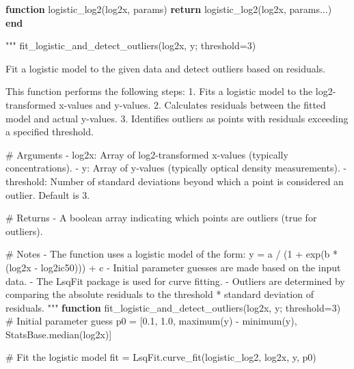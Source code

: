 \documentclass[
]{scrartcl}
\newenvironment{Shaded}{\begin{snugshade}}{\end{snugshade}}
\newcommand{\CommentTok}[1]{\textcolor[rgb]{0.37,0.37,0.37}{#1}}
\newcommand{\ControlFlowTok}[1]{\textcolor[rgb]{0.00,0.23,0.31}{\textbf{#1}}}
\newcommand{\FloatTok}[1]{\textcolor[rgb]{0.68,0.00,0.00}{#1}}
\newcommand{\FunctionTok}[1]{\textcolor[rgb]{0.28,0.35,0.67}{#1}}
\newcommand{\KeywordTok}[1]{\textcolor[rgb]{0.00,0.23,0.31}{\textbf{#1}}}
\newcommand{\NormalTok}[1]{\textcolor[rgb]{0.00,0.23,0.31}{#1}}
\newcommand{\OperatorTok}[1]{\textcolor[rgb]{0.37,0.37,0.37}{#1}}
\newcommand{\StringTok}[1]{\textcolor[rgb]{0.13,0.47,0.30}{#1}}
\begin{document}
\begin{Shaded}
\begin{Highlighting}[]
\KeywordTok{function} \FunctionTok{logistic\_log2}\NormalTok{(log2x, params)}
    \ControlFlowTok{return} \FunctionTok{logistic\_log2}\NormalTok{(log2x, params}\OperatorTok{...}\NormalTok{)}
\KeywordTok{end}

\StringTok{"""}
\StringTok{    fit\_logistic\_and\_detect\_outliers(log2x, y; threshold=3)}

\StringTok{Fit a logistic model to the given data and detect outliers based on residuals.}

\StringTok{This function performs the following steps:}
\StringTok{1. Fits a logistic model to the log2{-}transformed x{-}values and y{-}values.}
\StringTok{2. Calculates residuals between the fitted model and actual y{-}values.}
\StringTok{3. Identifies outliers as points with residuals exceeding a specified threshold.}

\StringTok{\# Arguments}
\StringTok{{-} \textasciigrave{}log2x\textasciigrave{}: Array of log2{-}transformed x{-}values (typically concentrations).}
\StringTok{{-} \textasciigrave{}y\textasciigrave{}: Array of y{-}values (typically optical density measurements).}
\StringTok{{-} \textasciigrave{}threshold\textasciigrave{}: Number of standard deviations beyond which a point is considered an outlier. Default is 3.}

\StringTok{\# Returns}
\StringTok{{-} A boolean array indicating which points are outliers (true for outliers).}

\StringTok{\# Notes}
\StringTok{{-} The function uses a logistic model of the form: }
\StringTok{    y = a / (1 + exp(b * (log2x {-} log2ic50))) + c}
\StringTok{{-} Initial parameter guesses are made based on the input data.}
\StringTok{{-} The LsqFit package is used for curve fitting.}
\StringTok{{-} Outliers are determined by comparing the absolute residuals to the threshold * standard deviation of residuals.}
\StringTok{"""}
\KeywordTok{function} \FunctionTok{fit\_logistic\_and\_detect\_outliers}\NormalTok{(log2x, y; threshold}\OperatorTok{=}\FloatTok{3}\NormalTok{)}
    \CommentTok{\# Initial parameter guess}
\NormalTok{    p0 }\OperatorTok{=}\NormalTok{ [}\FloatTok{0.1}\NormalTok{, }\FloatTok{1.0}\NormalTok{, }\FunctionTok{maximum}\NormalTok{(y) }\OperatorTok{{-}} \FunctionTok{minimum}\NormalTok{(y), StatsBase.}\FunctionTok{median}\NormalTok{(log2x)]}

    \CommentTok{\# Fit the logistic model}
\NormalTok{    fit }\OperatorTok{=}\NormalTok{ LsqFit.}\FunctionTok{curve\_fit}\NormalTok{(logistic\_log2, log2x, y, p0)}


\end{Highlighting}
\end{Shaded}
\end{document}

